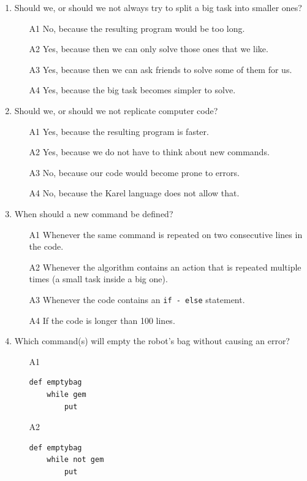 {{{{\begin{enumerate}
\item Should we, or should we not always try to split a big task into smaller ones?
\begin{enumerate}
\item[A1] No, because the resulting program would be too long.
\item[A2] Yes, because then we can only solve those ones that we like.
\item[A3] Yes, because then we can ask friends to solve some of them for us.
\item[A4] Yes, because the big task becomes simpler to solve.
\end{enumerate}
\item Should we, or should we not replicate computer code?
\begin{enumerate}
\item[A1] Yes, because the resulting program is faster.
\item[A2] Yes, because we do not have to think about new commands.
\item[A3] No, because our code would become prone to errors.
\item[A4] No, because the Karel language does not allow that.
\end{enumerate}
\item When should a new command be defined?
\begin{enumerate}
\item[A1] Whenever the same command is repeated on two consecutive lines in the code.
\item[A2] Whenever the algorithm contains an action that is repeated multiple times
          (a small task inside a big one).
\item[A3] Whenever the code contains an {\tt if - else} statement.
\item[A4] If the code is longer than 100 lines.
\end{enumerate}
\item Which command(s) will empty the robot's bag without causing an error?
\begin{enumerate}
\item[A1] 
\begin{verbatim}
def emptybag
    while gem
        put
\end{verbatim}
\item[A2] 
\begin{verbatim}
def emptybag
    while not gem
        put
\end{verbatim}

\end{enumerate}
\end{enumerate}}}}}
